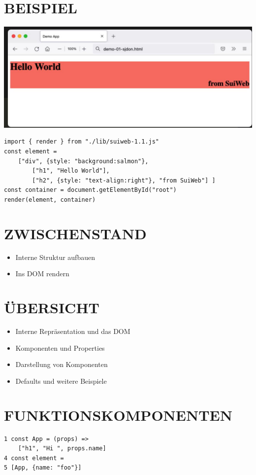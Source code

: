 \documentclass[10pt]{article}
\begin{document}
\section*{BEISPIEL}
\begin{center}
\includegraphics[width=\linewidth]{images/2025_01_02_254b5e4c52d090c313e1g-18}
\end{center}

\begin{verbatim}
import { render } from "./lib/suiweb-1.1.js"
const element =
    ["div", {style: "background:salmon"},
        ["h1", "Hello World"],
        ["h2", {style: "text-align:right"}, "from SuiWeb"] ]
const container = document.getElementById("root")
render(element, container)
\end{verbatim}

\section*{ZWISCHENSTAND}
\begin{itemize}
  \item Interne Struktur aufbauen
  \item Ins DOM rendern
\end{itemize}



\section*{ÜBERSICHT}
\begin{itemize}
  \item Interne Repräsentation und das DOM
  \item Komponenten und Properties
  \item Darstellung von Komponenten
  \item Defaults und weitere Beispiele
\end{itemize}

\section*{FUNKTIONSKOMPONENTEN}
\begin{verbatim}
1 const App = (props) =>
    ["h1", "Hi ", props.name]
4 const element =
5 [App, {name: "foo"}]
\end{verbatim}
\end{document}
